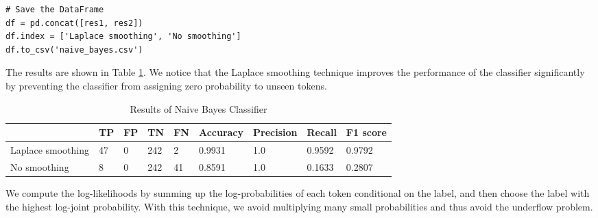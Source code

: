 \begin{solution}
\begin{verbatim}
# Save the DataFrame
df = pd.concat([res1, res2])
df.index = ['Laplace smoothing', 'No smoothing']
df.to_csv('naive_bayes.csv')
    \end{verbatim}
    The results are shown in Table \ref{tab:nb}. We notice that the Laplace smoothing technique improves the performance of the classifier significantly by preventing the classifier from assigning zero probability to unseen tokens.
    \begin{table}[H]
        \centering
        \caption{Results of Naive Bayes Classifier}
        \label{tab:nb}
        \begin{tabular}{lllllllll}
            \toprule
                              & TP & FP & TN  & FN & Accuracy & Precision & Recall & F1 score \\
            \midrule
            Laplace smoothing & 47 & 0  & 242 & 2  & 0.9931   & 1.0       & 0.9592 & 0.9792   \\
            No smoothing      & 8  & 0  & 242 & 41 & 0.8591   & 1.0       & 0.1633 & 0.2807   \\
            \bottomrule
        \end{tabular}
    \end{table}

     We compute the log-likelihoods by summing up the log-probabilities of each token conditional on the label, and then choose the label with the highest log-joint probability. With this technique, we avoid multiplying many small probabilities and thus avoid the underflow problem.
    \qedhere

\end{solution}
\clearpage


